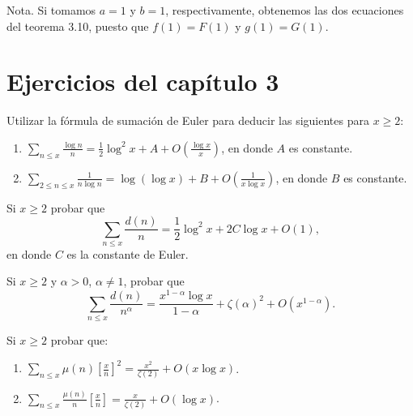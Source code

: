 \documentclass[12pt,a4paper]{book}
\begin{document}
    Nota. Si tomamos $a=1$ y $b=1$, respectivamente, obtenemos las dos ecuaciones del
    teorema 3.10, puesto que $f(1)=F(1)$ y $g(1)=G(1)$.

    \section*{Ejercicios del capítulo 3}

    \begin{ejercicio}
        Utilizar la fórmula de sumación de Euler para deducir las siguientes para
        $x\geq2$:
        \begin{enumerate}
            \item[(a)] $\displaystyle\sum_{n\leq x}\frac{\log n}{n}=\frac{1}{2}\log^2x+A
            +O\left(\frac{\log x}{x}\right)$, en donde $A$ es constante.
            \item[(b)] $\displaystyle\sum_{2\leq n\leq x}\frac{1}{n\log n}=\log(\log x)+B
            +O\left(\frac{1}{x\log x}\right)$, en donde $B$ es constante.
        \end{enumerate}
    \end{ejercicio}

    \begin{ejercicio}
        Si $x\geq2$ probar que
        \begin{equation*}
            \sum_{n\leq x}\frac{d(n)}{n}=\frac{1}{2}\log^2x+2C\log x+O(1),
        \end{equation*}
        en donde $C$ es la constante de Euler.
    \end{ejercicio}

    \begin{ejercicio}
        Si $x\geq2$ y $\alpha>0$, $\alpha\neq1$, probar que
        \begin{equation*}
            \sum_{n\leq x}\frac{d(n)}{n^\alpha}=\frac{x^{1-\alpha}\log x}{1-\alpha}
            +\zeta(\alpha)^2+O(x^{1-\alpha}).
        \end{equation*}
    \end{ejercicio}

    \begin{ejercicio}
        Si $x\geq2$ probar que:
        \begin{enumerate}
            \item[(a)] $\displaystyle\sum_{n\leq x}\mu(n)\left[\frac{x}{n}\right]^2
            =\frac{x^2}{\zeta(2)}+O(x\log x)$.
            \item[(b)] $\displaystyle\sum_{n\leq x}\frac{\mu(n)}{n}\left[\frac{x}{n}\right]
            =\frac{x}{\zeta(2)}+O(\log x)$.
        \end{enumerate}
    \end{ejercicio}
\end{document}
